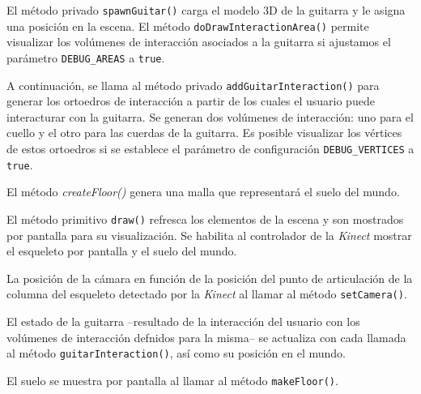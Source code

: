 \documentclass[10pt,a4paper]{report}
\begin{document}
	El método privado \texttt{spawnGuitar()} carga el modelo 3D de la guitarra y le asigna una posición en la escena. El método \texttt{doDrawInteractionArea()} permite visualizar los volúmenes de interacción asociados a la guitarra si ajustamos el parámetro \texttt{DEBUG\_AREAS} a \texttt{true}.
	
	A continuación, se llama al método privado \texttt{addGuitarInteraction()} para generar los ortoedros de interacción a partir de los cuales el usuario puede interacturar con la guitarra. Se generan dos volúmenes de interacción: uno para el cuello y el otro para las cuerdas de la guitarra. Es posible visualizar los vértices de estos ortoedros si se establece el parámetro de configuración \texttt{DEBUG\_VERTICES} a \texttt{true}.
	
	
	
	El método \textit{createFloor()} genera una malla que representará el suelo del mundo.
	
	
	
	El método primitivo \texttt{draw()} refresca los elementos de la escena y son mostrados por pantalla para su visualización. Se habilita al controlador de la \textit{Kinect} mostrar el esqueleto por pantalla y el suelo del mundo. 
	
		
	
	La posición de la cámara en función de la posición del punto de articulación de la columna del esqueleto detectado por la \textit{Kinect} al llamar al método \texttt{setCamera()}.
	
	
	
	El estado de la guitarra --resultado de la interacción del usuario con los volúmenes de interacción defnidos para la misma-- se actualiza con cada llamada al método \texttt{guitarInteraction()}, así como su posición en el mundo.
	
	 
	 
	 El suelo se muestra por pantalla al llamar al método \texttt{makeFloor()}.
	 
	 
	 
\end{document}
